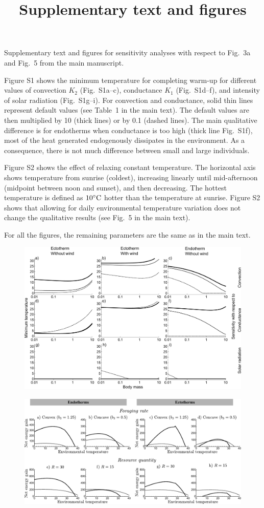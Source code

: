 \documentclass[11pt]{article}
\title{Supplementary text and figures}
\date{\vspace{-5ex}}
\begin{document}
\maketitle

Supplementary text and figures for sensitivity analyses with respect to Fig.~3a and Fig.~5 from the main manuscript.

Figure S1 shows the minimum temperature for completing warm-up for different values of convection $K_2$ (Fig.~S1a--c), conductance $K_1$ (Fig.~S1d--f), and intensity of solar radiation (Fig.~S1g--i).
For convection and conductance, solid thin lines represent default values (see Table~1 in the main text).
The default values are then multiplied by 10 (thick lines) or by 0.1 (dashed lines).
The main qualitative difference is for endotherms when conductance is too high (thick line Fig.~S1f), most of the heat generated endogenously dissipates in the environment.
As a consequence, there is not much difference between small and large individuals.

Figure S2 shows the effect of relaxing constant temperature.
The horizontal axis shows temperature from sunrise (coldest), increasing linearly until mid-afternoon (midpoint between noon and sunset), and then decreasing.
The hottest temperature is defined as $10 ^{\circ}\rm{C}$ hotter than the temperature at sunrise.
Figure S2 shows that allowing for daily environmental temperature variation does not change the qualitative results (see Fig.~5 in the main text).

For all the figures, the remaining parameters are the same as in the main text.

\renewcommand{\thefigure}{S\arabic{figure}}

\begin{figure}[h]
    \includegraphics[width=\textwidth]{figS1}
	\caption{} %
	\label{fig:S1}
\end{figure}

\begin{figure}[h]
    \includegraphics[width=\textwidth]{figS2}
	\caption{} %
	\label{fig:S2}
\end{figure}
\end{document}
